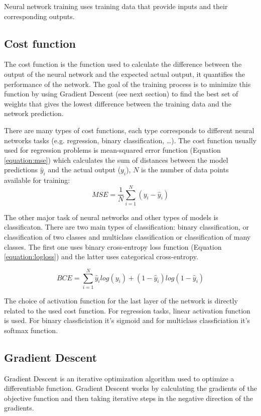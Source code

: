 Neural network training uses training data that provide inputs and their corresponding outputs.

\subsection{Cost function}
The cost function is the function used to calculate the difference between the output of the neural network and the expected actual output, it quantifies the performance of the network. The goal of the training process is to minimize this function by using Gradient Descent (see next section) to find the best set of weights that gives the lowest difference between the training data and the network prediction.

There are many types of cost functions, each type corresponds to different neural networks tasks (e.g. regression, binary classification, …). The cost function usually used for regression problems is mean-squared error function (Equation \ref{equation:mse}) which calculates the sum of distances between the model predictions $\hat{y}_i$ and the actual output ($y_i$), $N$ is the number of data points available for training:
\begin{equation}
    MSE=\frac{1}{N}\sum_{i=1}^N(y_i-\hat{y}_i)
    \label{equation:mse}
\end{equation}

The other major task of neural networks and other types of models is classificaton. There are two main types of classification: binary classification, or classification of two classes and multiclass classification or classification of many classes. The first one uses binary cross-entropy loss function (Equation \ref{equation:logloss}) and the latter uses categorical cross-entropy.

\begin{equation}
    BCE = \sum_{i=1}^{N}\hat{y}_i log(y_i)+(1-\hat{y}_i)log(1-\hat{y}_i)
    \label{equation:logloss}
\end{equation}

The choice of activation function for the last layer of the network is directly related to the used cost function. For regression tasks, linear activation function is used. For binary classficiation it's sigmoid and for multiclass classficiation it's softmax function.

\subsection{Gradient Descent}
Gradient Descent is an iterative optimization algorithm used to optimize a differentiable function. Gradient Descent works by calculating the gradients of the objective function and then taking iterative steps in the negative direction of the gradients.

